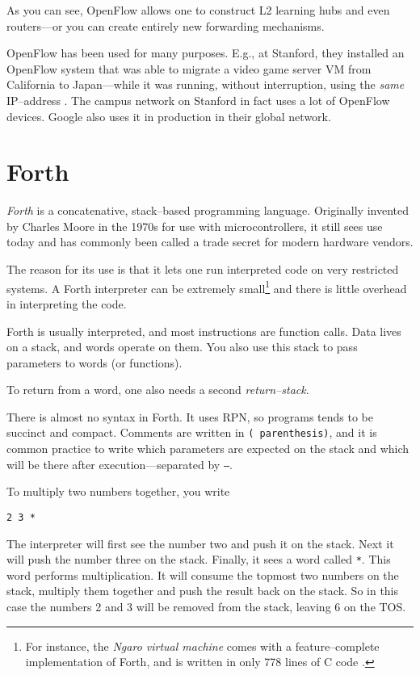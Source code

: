 As you can see, OpenFlow allows one to construct L2 learning hubs and even
routers---or you can create entirely new forwarding mechanisms.

OpenFlow has been used for many purposes.  E.g., at Stanford, they installed
an OpenFlow system that was able to migrate a video game server \ac{VM} from
California to Japan---while it was running, without interruption, using the
\textit{same} IP--address \cite{erickson2008demonstration}
\cite{kobayashi2013maturing}.
The campus network on Stanford in fact uses a lot of OpenFlow devices.
Google also uses it in production in their global network.

\section{Forth}

\textit{Forth} is a concatenative, stack--based programming language.
Originally invented by Charles Moore in the 1970s for use with
microcontrollers, it still sees use today and has commonly been called a
trade secret for modern hardware vendors.

The reason for its use is that it lets one run interpreted code on very
restricted systems. A Forth interpreter can be extremely small\footnote{For
instance, the \textit{Ngaro virtual machine} comes with a feature--complete
implementation of Forth, and is written in only 778 lines of C code
\cite{ngaro.vm.core}.}
and there is little overhead in interpreting the code.

Forth is usually interpreted, and most instructions are function calls.
Data lives on a stack, and words operate on them.  You also use this stack
to pass parameters to words (or functions).

To return from a word, one also needs a second \textit{return--stack}.

There is almost no syntax in Forth.  It uses \ac{RPN}, so programs tends to
be succinct and compact.  Comments are written in \texttt{( parenthesis)},
and it is common practice to write which parameters are expected on the
stack and which will be there after execution---separated by \texttt{--}.

To multiply two numbers together, you write

\begin{verbatim}
2 3 *
\end{verbatim}

The interpreter will first see the number two and push it on the stack. Next
it will push the number three on the stack. Finally, it sees a word called
\texttt{*}.  This word performs multiplication. It will consume the topmost
two numbers on the stack, multiply them together and push the result back on
the stack. So in this case the numbers 2 and 3 will be removed from the
stack, leaving 6 on the \ac{TOS}.

